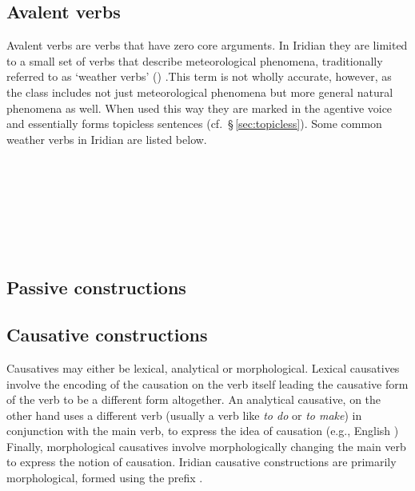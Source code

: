 \subsection{Avalent verbs}

Avalent verbs  are verbs that have zero core arguments. In Iridian they are limited to a small set of verbs that describe meteorological phenomena, traditionally referred to as `weather verbs' () .This term is not wholly accurate, however, as the class includes not just meteorological phenomena but more general natural phenomena as well. When used this way they are marked in the agentive voice and essentially forms topicless sentences (cf.~\S\,\ref{sec:topicless}). Some common weather verbs in Iridian are listed below.

\pex{}
\\
\\
\\
\\
\\
\\
\xe



\subsection{Passive constructions}


\subsection{Causative constructions}

Causatives may either be lexical, analytical or morphological. Lexical causatives involve the encoding of the causation on the verb itself leading the causative form of the verb to be a different form altogether. An analytical causative, on the other hand uses a different verb (usually a verb like \emph{to do} or \emph{to make}) in conjunction with the main verb, to express the idea of causation (e.g., English ) Finally, morphological causatives involve morphologically changing the main verb to express the notion of causation. Iridian causative constructions are primarily morphological, formed using the prefix .

